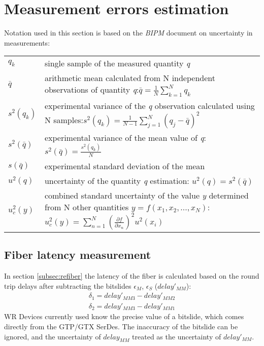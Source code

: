 \section{Measurement errors estimation}
\label{sec:errors}

Notation used in this section is based on the \emph{BIPM} document on uncertainty in
measurements\cite{bipm_errors}\vspace{0.1cm}:

\begin{tabular}{p{1cm} p{14cm}}
 $q_k$ & single sample of the measured quantity \emph{q}\\
 $\bar{q}$ & arithmetic mean calculated from N independent observations of quantity \emph{q}:\newline $\bar{q} = \frac{1}{N}\sum\limits_{k=1}^N q_k$\\
 $s^2 (q_k)$ & experimental variance of the \emph{q} observation calculated using N samples:\newline $s^2(q_k) = \frac{1}{N-1}\sum\limits_{j=1}^N (q_j - \bar{q})^2$\\
 
 $s^2 (\bar{q})$ & experimental variance of the mean value of \emph{q}:
 $s^2 (\bar{q}) = \frac{s^2(q_k)}{N}$\\
 
 $s(\bar{q})$ & experimental standard deviation of the mean\\
 $u^2(q)$ & uncertainty of the quantity \emph{q} estimation: $u^2(q) = s^2(\bar{q})$\\
 $u_c^2(y)$ & combined standard uncertainty of the value \emph{y} determined from N other quantities $y = f(x_1, x_2, ..., x_N)$:
 	$u_c^2(y) = \sum\limits_{n=1}^N \left( \frac{\partial f}{\partial x_n}\right) ^2 u^2(x_i)$ \\
\end{tabular}

\subsection{Fiber latency measurement}
\label{subsec:errors:filat}

In section \ref{subsec:refiber} the latency of the fiber is calculated based
on the round trip delays after subtracting the bitslides $\epsilon_M$,
$\epsilon_S$ ($delay'_{MM}$):
\begin{align}
	\delta_1 = delay'_{MM3} - delay'_{MM2}\\
	\delta_2 = delay'_{MM3} - delay'_{MM1}
\end{align}
WR Devices currently used know the precise value of a bitslide, which comes
directly from the GTP/GTX SerDes. The inaccuracy of the bitslide can be ignored,
and the uncertainty of $delay_{MM}$ treated as the uncertainty of
$delay'_{MM}$.\\

